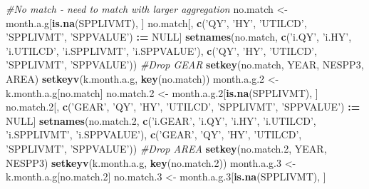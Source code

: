 \documentclass[]{article}
\newenvironment{Shaded}{\begin{snugshade}}{\end{snugshade}}
\newcommand{\KeywordTok}[1]{\textcolor[rgb]{0.13,0.29,0.53}{\textbf{#1}}}
\newcommand{\DecValTok}[1]{\textcolor[rgb]{0.00,0.00,0.81}{#1}}
\newcommand{\StringTok}[1]{\textcolor[rgb]{0.31,0.60,0.02}{#1}}
\newcommand{\CommentTok}[1]{\textcolor[rgb]{0.56,0.35,0.01}{\textit{#1}}}
\newcommand{\OtherTok}[1]{\textcolor[rgb]{0.56,0.35,0.01}{#1}}
\newcommand{\OperatorTok}[1]{\textcolor[rgb]{0.81,0.36,0.00}{\textbf{#1}}}
\newcommand{\ErrorTok}[1]{\textcolor[rgb]{0.64,0.00,0.00}{\textbf{#1}}}
\newcommand{\NormalTok}[1]{#1}
\begin{document}
\begin{Shaded}
\begin{Highlighting}[]
{{{{{{{{{{{{{{{{{{{{{  \CommentTok{#No match - need to match with larger aggregation}
\NormalTok{  no.match  <-}\StringTok{ }\NormalTok{month.a.g[}\KeywordTok{is.na}\NormalTok{(SPPLIVMT), ]}
\NormalTok{  no.match[, }\KeywordTok{c}\NormalTok{(}\StringTok{'QY'}\NormalTok{, }\StringTok{'HY'}\NormalTok{, }\StringTok{'UTILCD'}\NormalTok{, }\StringTok{'SPPLIVMT'}\NormalTok{, }\StringTok{'SPPVALUE'}\NormalTok{) }\OperatorTok{:}\ErrorTok{=}\StringTok{ }\OtherTok{NULL}\NormalTok{]}
  \KeywordTok{setnames}\NormalTok{(no.match, }\KeywordTok{c}\NormalTok{(}\StringTok{'i.QY'}\NormalTok{, }\StringTok{'i.HY'}\NormalTok{, }\StringTok{'i.UTILCD'}\NormalTok{, }\StringTok{'i.SPPLIVMT'}\NormalTok{, }\StringTok{'i.SPPVALUE'}\NormalTok{), }
           \KeywordTok{c}\NormalTok{(}\StringTok{'QY'}\NormalTok{, }\StringTok{'HY'}\NormalTok{, }\StringTok{'UTILCD'}\NormalTok{, }\StringTok{'SPPLIVMT'}\NormalTok{, }\StringTok{'SPPVALUE'}\NormalTok{))}
  \CommentTok{#Drop GEAR}
  \KeywordTok{setkey}\NormalTok{(no.match, YEAR, NESPP3, AREA)}
  \KeywordTok{setkeyv}\NormalTok{(k.month.a.g, }\KeywordTok{key}\NormalTok{(no.match))}
\NormalTok{  month.a.g.}\DecValTok{2}\NormalTok{ <-}\StringTok{ }\NormalTok{k.month.a.g[no.match]}
\NormalTok{  no.match.}\DecValTok{2}\NormalTok{ <-}\StringTok{ }\NormalTok{month.a.g.}\DecValTok{2}\NormalTok{[}\KeywordTok{is.na}\NormalTok{(SPPLIVMT), ]}
\NormalTok{  no.match.}\DecValTok{2}\NormalTok{[, }\KeywordTok{c}\NormalTok{(}\StringTok{'GEAR'}\NormalTok{, }\StringTok{'QY'}\NormalTok{, }\StringTok{'HY'}\NormalTok{, }\StringTok{'UTILCD'}\NormalTok{, }\StringTok{'SPPLIVMT'}\NormalTok{, }\StringTok{'SPPVALUE'}\NormalTok{) }\OperatorTok{:}\ErrorTok{=}\StringTok{ }\OtherTok{NULL}\NormalTok{]}
  \KeywordTok{setnames}\NormalTok{(no.match.}\DecValTok{2}\NormalTok{, }\KeywordTok{c}\NormalTok{(}\StringTok{'i.GEAR'}\NormalTok{, }\StringTok{'i.QY'}\NormalTok{, }\StringTok{'i.HY'}\NormalTok{, }\StringTok{'i.UTILCD'}\NormalTok{, }\StringTok{'i.SPPLIVMT'}\NormalTok{, }\StringTok{'i.SPPVALUE'}\NormalTok{), }
           \KeywordTok{c}\NormalTok{(}\StringTok{'GEAR'}\NormalTok{, }\StringTok{'QY'}\NormalTok{, }\StringTok{'HY'}\NormalTok{, }\StringTok{'UTILCD'}\NormalTok{, }\StringTok{'SPPLIVMT'}\NormalTok{, }\StringTok{'SPPVALUE'}\NormalTok{))}
  \CommentTok{#Drop AREA}
  \KeywordTok{setkey}\NormalTok{(no.match.}\DecValTok{2}\NormalTok{, YEAR, NESPP3)}
  \KeywordTok{setkeyv}\NormalTok{(k.month.a.g, }\KeywordTok{key}\NormalTok{(no.match.}\DecValTok{2}\NormalTok{))}
\NormalTok{  month.a.g.}\DecValTok{3}\NormalTok{ <-}\StringTok{ }\NormalTok{k.month.a.g[no.match.}\DecValTok{2}\NormalTok{]}
\NormalTok{  no.match.}\DecValTok{3}\NormalTok{ <-}\StringTok{ }\NormalTok{month.a.g.}\DecValTok{3}\NormalTok{[}\KeywordTok{is.na}\NormalTok{(SPPLIVMT), ]}
}}}}}}}}}}}}}}}}}}}}}
\end{Highlighting}
\end{Shaded}
\end{document}
